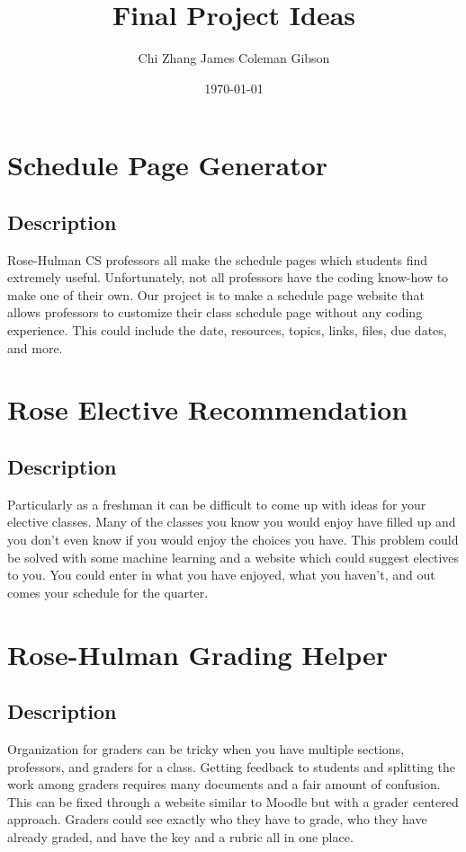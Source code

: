 \documentclass{article}
\title{\Huge Final Project Ideas}
\author{\large Chi Zhang James Coleman Gibson}
\date{\small \today}
\begin{document}
\maketitle

\section{Schedule Page Generator}
\subsection*{Description}
Rose-Hulman CS professors all make the schedule pages which students find
extremely useful. Unfortunately, not all professors have the coding know-how
to make one of their own. Our project is to make a schedule page website that
allows professors to customize their class schedule page without any coding
experience. This could include the date, resources, topics, links, files, due
dates, and more. 

\section{Rose Elective Recommendation}
\subsection*{Description}
Particularly as a freshman it can be difficult to come up with ideas for your
elective classes. Many of the classes you know you would enjoy have filled up
and you don't even know if you would enjoy the choices you have. This problem
could be solved with some machine learning and a website which could suggest
electives to you. You could enter in what you have enjoyed, what you haven't,
and out comes your schedule for the quarter.

\section{Rose-Hulman Grading Helper}
\subsection*{Description}
Organization for graders can be tricky when you have multiple sections,
professors, and graders for a class. Getting feedback to students and splitting
the work among graders requires many documents and a fair amount of confusion.
This can be fixed through a website similar to Moodle but with a grader
centered approach. Graders could see exactly who they have to grade, who they
have already graded, and have the key and a rubric all in one place.
\end{document}
